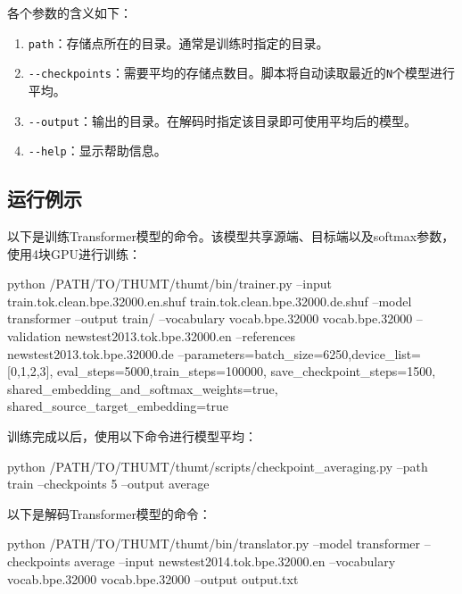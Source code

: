 \documentclass{article}
\begin{document}
各个参数的含义如下：
\begin{enumerate}
\item \verb|path|：存储点所在的目录。通常是训练时指定的目录。
\item \verb|--checkpoints|：需要平均的存储点数目。脚本将自动读取最近的\verb|N|个模型进行平均。
\item \verb|--output|：输出的目录。在解码时指定该目录即可使用平均后的模型。
\item \verb|--help|：显示帮助信息。
\end{enumerate}


\subsection{运行例示}
以下是训练Transformer模型的命令。该模型共享源端、目标端以及softmax参数，使用4块GPU进行训练：
\begin{everbatim}
python /PATH/TO/THUMT/thumt/bin/trainer.py
  --input train.tok.clean.bpe.32000.en.shuf
          train.tok.clean.bpe.32000.de.shuf
  --model transformer --output train/
  --vocabulary vocab.bpe.32000 vocab.bpe.32000
  --validation newstest2013.tok.bpe.32000.en
  --references newstest2013.tok.bpe.32000.de
  --parameters=batch_size=6250,device_list=[0,1,2,3],
               eval_steps=5000,train_steps=100000,
               save_checkpoint_steps=1500,
               shared_embedding_and_softmax_weights=true,
               shared_source_target_embedding=true
\end{everbatim}
训练完成以后，使用以下命令进行模型平均：
\begin{everbatim}
python /PATH/TO/THUMT/thumt/scripts/checkpoint_averaging.py
  --path train --checkpoints 5 --output average
\end{everbatim}
以下是解码Transformer模型的命令：
\begin{everbatim}
python /PATH/TO/THUMT/thumt/bin/translator.py
  --model transformer
  --checkpoints average
  --input newstest2014.tok.bpe.32000.en
  --vocabulary vocab.bpe.32000 vocab.bpe.32000
  --output output.txt
\end{everbatim}



\end{document}
